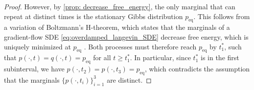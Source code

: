 \documentclass[twoside]{article}
\begin{document}
\begin{proof}
However, by \cref{prop: decrease_free_energy}, the only marginal that can repeat at distinct times is the stationary Gibbs distribution $p_{\mathrm{eq}}$. This follows from a variation of Boltzmann's H-theorem, which states that the marginals of a gradient-flow SDE \eqref{eq:overdamped_langevin_SDE} decrease free energy, which is uniquely minimized at $p_{\mathrm{eq}}$ \citep{jordan1998variational,chafai2015boltzmann}. 
Both processes must therefore reach $p_{\mathrm{eq}}$ by $t_1^*$, such that  $p(\cdot, t) = q(\cdot, t) = p_{\mathrm{eq}}$ for all $t \ge t_1^*$. In particular, since $t_1^*$ is in the first subinterval, we have $p(\cdot, t_2) = p(\cdot, t_3) = p_{\mathrm{eq}}$, which contradicts the assumption that the marginals $\{p(\cdot, t_i)\}_{i=1}^3$ are distinct. 
\end{proof}




  
\end{document}
